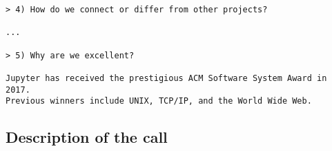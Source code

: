 \begin{draft}
\begin{verbatim}
> 4) How do we connect or differ from other projects?

...

> 5) Why are we excellent?

Jupyter has received the prestigious ACM Software System Award in 2017.
Previous winners include UNIX, TCP/IP, and the World Wide Web.

\end{verbatim}





\subsection*{Description of the call}




\renewcommand{\thepage}{\arabic{page}}
\setcounter{page}{1}
\black
\cleardoublepage
\end{draft}


